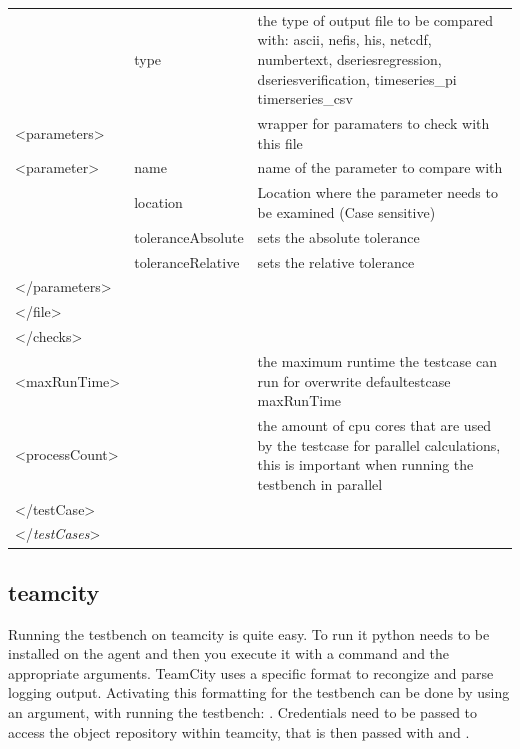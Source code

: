 \documentclass{deltares_memo}
\begin{document}
\begin{longtable}{p{30mm}p{45mm}p{\textwidth - 75mm - 36pt}}
     & type & the type of output file to be compared with: ascii, nefis, his, netcdf, numbertext, dseriesregression, dseriesverification, timeseries\_pi timerseries\_csv \\
<parameters> & & wrapper for paramaters to check with this file \\
<parameter> & name & name of the parameter to compare with \\
     & location & Location where the parameter needs to be examined (Case sensitive) \\
     & toleranceAbsolute & sets the absolute tolerance\\
     & toleranceRelative & sets the relative tolerance \\
</parameters> & & \\
</file> & & \\
</checks> & & \\
<maxRunTime> & & the maximum runtime the testcase can run for overwrite defaultestcase maxRunTime \\
<processCount> & & the amount of cpu cores that are used by the testcase for parallel calculations, this is important when running the testbench in parallel \\
</testCase> & & \\
</\emph{testCases}>
\end{longtable}
\subsection{teamcity}
Running the testbench on teamcity is quite easy. To run it python needs to be installed on the agent and then you execute it with a command and the appropriate arguments.
TeamCity uses a specific format to recongize and parse logging output. Activating this formatting for the testbench can be done by using an argument, with running the testbench: . Credentials need to be passed to access the object repository within teamcity, that is then passed with  and .
\end{document}
